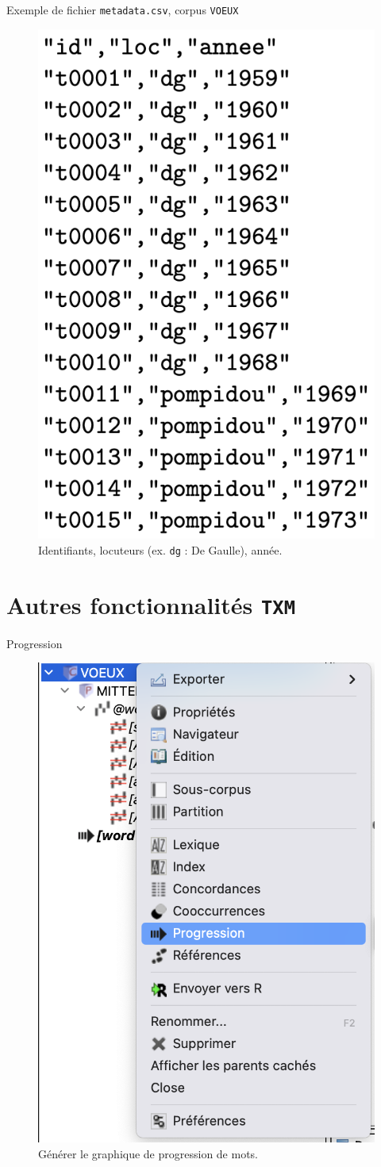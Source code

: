 \documentclass[xetex,xcolor={table,usenames,dvipsnames}]{beamer}
\begin{document}
\begin{frame}{Exemple de fichier \texttt{metadata.csv}, corpus \texttt{VOEUX}}
		\begin{figure}[h] %
		\centering
		\includegraphics[width=.4\linewidth]{img/metadata_csv.png}
		\caption{Identifiants, locuteurs (ex. \texttt{dg} : De Gaulle), année.}
		\label{fig:ling_out_TAL}
	\end{figure}
\end{frame}
\section{Autres fonctionnalités \texttt{TXM}}

\begin{frame}{Progression}
	\begin{figure}[h] %
		\centering
		\includegraphics[width=.4\linewidth]{img/generer_progression.png}
		\caption{Générer le graphique de progression de mots.}
		\label{fig:ling_out_TAL}
	\end{figure}
\end{frame}
\end{document}
